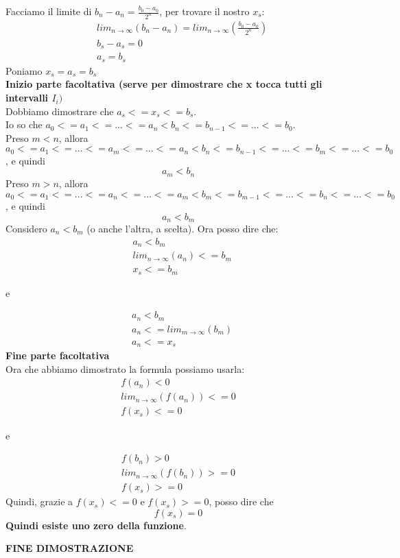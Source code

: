 \documentclass[11pt]{article}
\begin{document}
Facciamo il limite di $b_{n} - a_{n} = \frac{b_{0} - a_{0}}{2^{n}}$, per trovare il nostro $x_{s}$:
\begin{align*}
    &lim_{n \rightarrow \infty}(b_{n} - a_{n}) = lim_{n \rightarrow \infty}(\frac{b_{0} - a_{0}}{2^{n}})\\
    &b_{s} - a_{s} = 0\\
    &a_{s} = b_{s}
\end{align*}
Poniamo $x_{s} = a_{s} = b_{s}$\\
\textbf{Inizio parte facoltativa (serve per dimostrare che x tocca tutti gli intervalli $I_{i})$}\\
Dobbiamo dimostrare che $a_{s} <= x_{s} <= b_{s}$.\\
Io so che $a_{0} <= a_{1} <= ... <= a_{n} < b_{n} <= b_{n-1} <= ... <= b_{0}$.\\

Preso $m < n$, allora $a_{0} <= a_{1} <= ... <= a_{m} <= ... <= a_{n} < b_{n} <= b_{n-1} <= ... <= b_{m} <= ... <= b_{0}$, 
e quindi $$a_{m} < b_{n}$$
Preso $m > n$, allora $a_{0} <= a_{1} <= ... <= a_{n} <= ... <= a_{m} < b_{m} <= b_{m-1} <= ... <= b_{n} <= ... <= b_{0}$, 
e quindi $$a_{n} < b_{m}$$
Considero $a_{n} < b_{m}$ (o anche l'altra, a scelta). Ora posso dire che:
\begin{align*}
    &a_{n} < b_{m}\\
    &lim_{n \rightarrow \infty}(a_{n}) <= b_{m}\\
    &x_{s} <= b_{m}
\end{align*}
\begin{center}
    e
\end{center}
\begin{align*}
    &a_{n} < b_{m}\\
    &a_{n} <= lim_{m \rightarrow \infty}(b_{m})\\
    &a_{n} <= x_{s}
\end{align*}
\textbf{Fine parte facoltativa}\\
Ora che abbiamo dimostrato la formula possiamo usarla:
\begin{align*}
    f(a_{n}) < 0\\
    lim_{n \rightarrow \infty}(f(a_{n})) <= 0\\
    f(x_{s}) <= 0
\end{align*}
\begin{center}
    e
\end{center}
\begin{align*}
    f(b_{n}) > 0\\
    lim_{n \rightarrow \infty}(f(b_{n})) >= 0\\
    f(x_{s}) >= 0
\end{align*}
Quindi, grazie a $f(x_{s}) <= 0$ e $f(x_{s}) >= 0$, posso dire che 
$$f(x_{s}) = 0$$
\textbf{Quindi esiste uno zero della funzione}.
\begin{center}
   \textbf{FINE DIMOSTRAZIONE}
\end{center}
\end{document}
